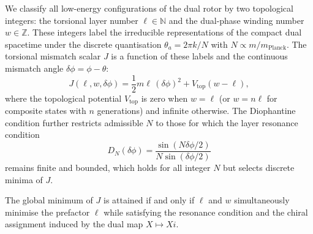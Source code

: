 \documentclass[a4paper]{article}
\begin{document}
We classify all low-energy configurations of the dual rotor by two topological integers: the torsional layer number \(\ell \in \mathbb{N}\) and the dual-phase winding number \(w \in \mathbb{Z}\). These integers label the irreducible representations of the compact dual spacetime under the discrete quantisation \(\theta_a = 2\pi k/N\) with \(N \propto m/m_\text{Planck}\). The torsional mismatch scalar \(J\) is a function of these labels and the continuous mismatch angle \(\delta\phi = \phi - \theta\):
\[
J(\ell,w,\delta\phi) = \frac12 m \ell \,(\delta\phi)^2 + V_\text{top}(w-\ell),
\]
where the topological potential \(V_\text{top}\) is zero when \(w=\ell\) (or \(w = n\ell\) for composite states with \(n\) generations) and infinite otherwise. The Diophantine condition further restricts admissible \(N\) to those for which the layer resonance condition
\[
D_N(\delta\phi) = \frac{\sin(N\delta\phi/2)}{N\sin(\delta\phi/2)}
\]
remains finite and bounded, which holds for all integer \(N\) but selects discrete minima of \(J\).

The global minimum of \(J\) is attained if and only if \(\ell\) and \(w\) simultaneously minimise the prefactor \(\ell\) while satisfying the resonance condition and the chiral assignment induced by the dual map \(X\mapsto Xi\).
\end{document}
